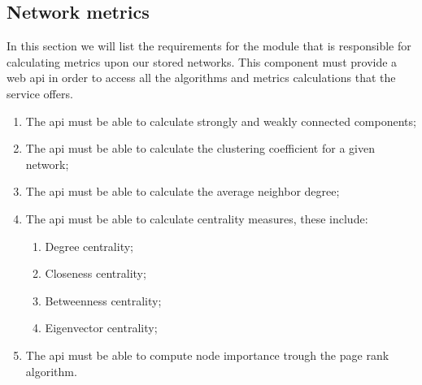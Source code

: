 \subsection{Network metrics}
\label{subsec:networkmetrics}

In this section we will list the requirements for the module that is responsible for calculating metrics upon our stored networks. This component must
provide a web \gls{api} in order to access all the algorithms and metrics calculations that the service offers.

\begin{enumerate}
    \item The \gls{api} must be able to calculate strongly and weakly connected components;
    \item The \gls{api} must be able to calculate the clustering coefficient for a given network;
    \item The \gls{api} must be able to calculate the average neighbor degree;
    \item The \gls{api} must be able to calculate centrality measures, these include:
    \begin{enumerate}
        \item Degree centrality;
        \item Closeness centrality;
        \item Betweenness centrality;
        \item Eigenvector centrality;
    \end{enumerate}
    \item The \gls{api} must be able to compute node importance trough the page rank algorithm.
\end{enumerate}
